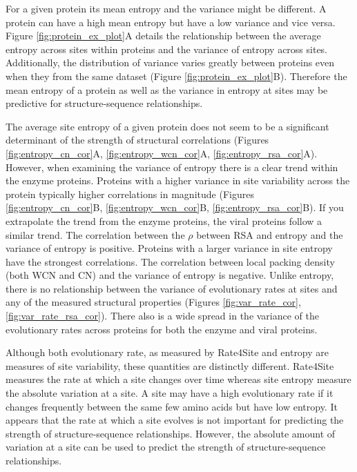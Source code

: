 \documentclass[12pt]{article}
\begin{document}
\indent For a given protein its mean entropy and the variance might be different. A protein can have a high mean entropy but have a low variance and vice versa. Figure \ref{fig:protein_ex_plot}A details the relationship between the average entropy across sites within proteins and the variance of entropy across sites. Additionally, the distribution of variance varies greatly between proteins even when they from the same dataset (Figure \ref{fig:protein_ex_plot}B). Therefore the mean entropy of a protein as well as the variance in entropy at sites may be predictive for structure-sequence relationships.

\indent  The average site entropy of a given protein does not seem to be a significant determinant of the strength of structural correlations (Figures \ref{fig:entropy_cn_cor}A, \ref{fig:entropy_wcn_cor}A, \ref{fig:entropy_rsa_cor}A). However, when examining the variance of entropy there is a clear trend within the enzyme proteins.  Proteins with a higher variance in site variability across the protein typically higher  correlations in magnitude (Figures \ref{fig:entropy_cn_cor}B, \ref{fig:entropy_wcn_cor}B, \ref{fig:entropy_rsa_cor}B). If you extrapolate the trend from the enzyme proteins, the viral proteins follow a similar trend. The correlation between the $\rho$ between RSA and entropy and the variance of entropy is positive. Proteins with a larger variance in site entropy have the strongest correlations. The correlation between local packing density (both WCN and CN) and the variance of entropy is negative. Unlike entropy, there is no relationship between the variance of evolutionary rates at sites and any of the measured structural properties (Figures \ref{fig:var_rate_cor}, \ref{fig:var_rate_rsa_cor}). There also is a wide spread in the variance of the evolutionary rates across proteins for both the enzyme and viral proteins. 

\indent Although both evolutionary rate, as measured by Rate4Site and entropy are measures of site variability, these quantities are distinctly different. Rate4Site measures the rate at which a site changes over time whereas site entropy measure the absolute variation at a site. A site may have a high evolutionary rate if it changes  frequently between the same few amino acids but have low entropy. It appears that the rate at which a site evolves is not important for predicting the strength of structure-sequence relationships. However, the absolute amount of variation at a site can be used to predict the strength of structure-sequence relationships. 
\end{document}
